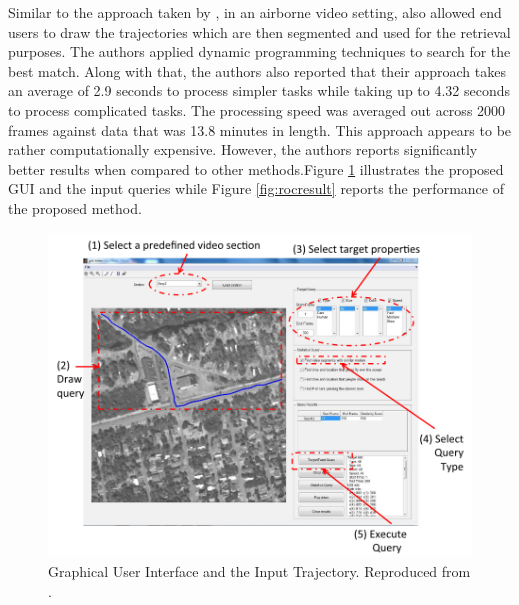 Similar to the approach taken by \cite{lai2015video}, in an airborne video
setting,  also allowed end users to draw the
trajectories which are then segmented and used for the retrieval purposes. The
authors applied dynamic programming techniques to search for the best match.
Along with that, the authors also reported that their approach takes an average
of 2.9 seconds to process simpler tasks while taking up to 4.32 seconds to
process complicated tasks. The processing speed was averaged out across 2000
frames against data that was 13.8 minutes in length. This approach appears to be
rather computationally expensive. However, the authors reports significantly
better results when compared to other methods.Figure \ref{fig:drawquery2}
illustrates the proposed GUI and the input queries while Figure
\ref{fig:rocresult} reports the performance of the proposed method.


\begin{figure}[hbt!]
  \centering
  \includegraphics[width=.6\textwidth]{image/lit/trajdraw2.PNG}
  \caption[Graphical User Interface and the Input Trajectory] {Graphical User
  Interface and the Input Trajectory. Reproduced from
  .}
\label{fig:drawquery2}
\end{figure}

